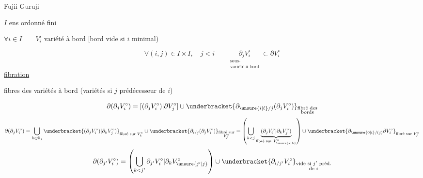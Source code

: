 Fujii Guruji 

$I$ ens ordonné fini

$\forall i\in I\qquad V_i^\circ$ variété à bord [bord vide si $i$ minimal)

\[
\forall(i,j)\in I\times I,\quad j<i\qquad
\underset{\substack{\text{sous-}\\\text{variété à bord}}}{\partial_jV_i^\circ}\subset\partial V_i^\circ
\]
\uline{fibration}

fibres des variétés à bord (variétés  si $j$ prédécesseur de $i$)

\[
\partial(\partial_jV_i^\circ)=[(\partial_jV_i^\circ)|\partial V_j^\circ]\cup
\underbracket{\partial_{\unsure{i|\ell}/j}(\partial_jV_i^\circ)}_{\substack{\text{fibré des}\\\text{bords}}}
\]
\[
\partial(\partial_jV_i^\circ)=\bigcup_{k\in\Phi_j}\underbracket{(\partial_jV_i^\circ)|\partial_kV_j^\circ)}_{\text{fibré sur }V_k^\circ}
\cup\underbracket{\partial_{i/j}(\partial_jV_i^\circ)}_{\substack{\text{fibré sur}\\V_j^\circ}}
=\left(\bigcup_{k<j}\underbrace{(\partial_jV_i^\circ|\partial_kV_j^\circ)}_{\text{fibré sur }V_{\unsure{k|h}}^\circ}\right)
\cup\underbracket{\partial_{\unsure{0|i}/(j)}\partial V_i^\circ}_{\text{fibré sur }V_j^\circ}
\]
\[
\partial(\partial_{j'}V_i^\circ)=\left(\bigcup_{k<j'}\partial_{j'}V_i^\circ|\partial_kV_{\unsure{j'|j}}^\circ\right)\cup
\underbracket{\partial_{i/j'}V_i^\circ}_{\substack{\text{vide si }j'\text{ préd.}\\\text{de }i}}
\]

